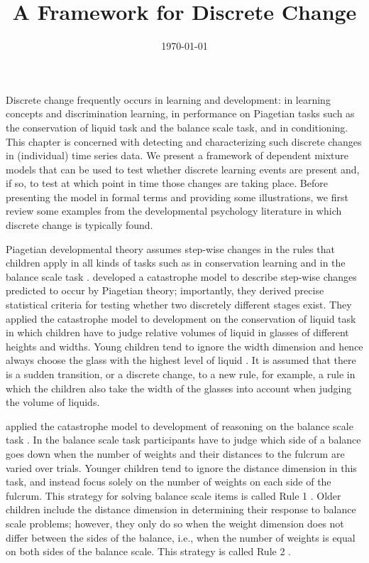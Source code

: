 \documentclass[a4paper,12pt,man]{apa} %
\title{A Framework for Discrete Change}
\date{\today}
\newcommand{\citep}{\cite}
\newcommand{\citet}{\citeA}
\begin{document}
\maketitle

Discrete change frequently occurs in learning and development: in
learning concepts and discrimination learning, in performance on
Piagetian tasks such as the conservation of liquid task and the
balance scale task, and in conditioning.  This chapter is concerned
with detecting and characterizing such discrete changes in
(individual) time series data.  We present a framework of dependent
mixture models that can be used to test whether discrete learning
events are present and, if so, to test at which point in time those
changes are taking place.  Before presenting the model in formal terms
and providing some illustrations, we first review some examples from
the developmental psychology literature in which discrete change is
typically found.

Piagetian developmental theory assumes step-wise changes in the rules
that children apply in all kinds of tasks such as in conservation
learning and in the balance scale task \citep{Siegler2005}.
\citet{Maas1992} developed a catastrophe model to describe step-wise
changes predicted to occur by Piagetian theory; importantly, they
derived precise statistical criteria for testing whether two
discretely different stages exist.  They applied the catastrophe model
to development on the conservation of liquid task \citep{Inhelder1958}
in which children have to judge relative volumes of liquid in glasses
of different heights and widths.  Young children tend to ignore the
width dimension and hence always choose the glass with the highest
level of liquid \citep{Inhelder1958}.  It is assumed that there is a
sudden transition, or a discrete change, to a new rule, for example, a
rule in which the children also take the width of the glasses into
account when judging the volume of liquids.

\citet{Jansen2001b} applied the catastrophe model to development of
reasoning on the balance scale task \citep{Siegler1981}.  In the
balance scale task participants have to judge which side of a balance
goes down when the number of weights and their distances to the
fulcrum are varied over trials.  Younger children tend to ignore the
distance dimension in this task, and instead focus solely on the
number of weights on each side of the fulcrum.  This strategy for
solving balance scale items is called Rule 1 \citep{Siegler1981}.
Older children include the distance dimension in determining their
response to balance scale problems; however, they only do so when the
weight dimension does not differ between the sides of the balance,
i.e., when the number of weights is equal on both sides of the balance
scale.  This strategy is called Rule 2 \cite{Siegler1981}.
\end{document}
